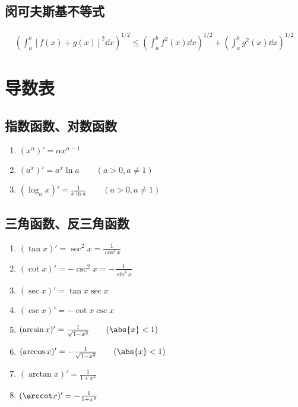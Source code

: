 \subsection{闵可夫斯基不等式}
\begin{align}
    \label{eq:闵可夫斯基不等式}
    \left( \int_a^b[f(x)+g(x)]^2\dd{x} \right)^{1/2}
    \leq
    \left( \int_a^bf^2(x)\dd{x} \right)^{1/2} +\left( \int_a^bg^2(x)\dd{x} \right)^{1/2}
\end{align}

\section{导数表}
\subsection{指数函数、对数函数}
\begin{multicols}{2}
    \begin{enumerate}
        \item $(x^\alpha)' = \alpha x^{\alpha-1}$
        \item $(a^x)' = a^x\ln a \qquad (a>0, a\neq 1)$
        \item $(\log_a x)' = \frac{1}{x\ln a} \qquad(a>0,a\neq 1)$
    \end{enumerate}
\end{multicols}

\subsection{三角函数、反三角函数}
\begin{multicols}{2}
    \begin{enumerate}
        \item $(\tan x)' =  \sec^2 x =  \frac{1}{\cos^2 x}$
        \item $(\cot x)' = -\csc^2 x = -\frac{1}{\sin^2 x}$
        \item $(\sec x)' =  \tan x\sec x$
        \item $(\csc x)' = -\cot x\csc x$
        \item $(\arcsin x)' = \frac{1}{\sqrt{1-x^2}} \qquad (\abs{x} < 1)$
        \item $(\arccos x)' =-\frac{1}{\sqrt{1-x^2}} \qquad (\abs{x} < 1)$
        \item $(\arctan x)' = \frac{1}{1+x^2}$
        \item $(\arccot x)' =-\frac{1}{1+x^2}$
    \end{enumerate}
\end{multicols}

